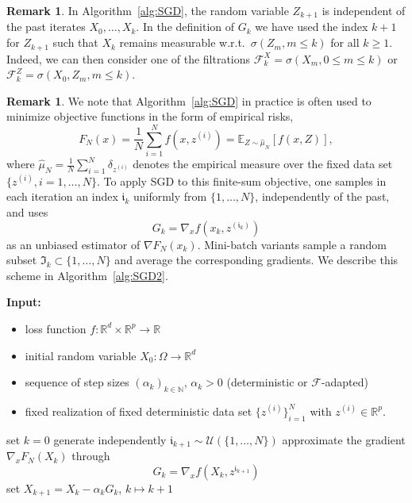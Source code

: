 \documentclass[12pt,openany]{book}
\theoremstyle{definition}
\newtheorem{remark}[thm]{Remark}
\theoremstyle{definition}
\newcommand{\E}{\mathbb{E}}
\newcommand{\N}{\mathbb{N}}
\newcommand{\R}{\mathbb{R}}
\begin{document}
\begin{remark}
In Algorithm~\ref{alg:SGD}, the random variable $Z_{k+1}$ is independent of the past iterates $X_0,\dots,X_k$. In the definition of $G_k$ we have used the index $k+1$ for $Z_{k+1}$ such that $X_k$ remains measurable w.r.t.~$\sigma(Z_m,m\le k)$ for all $k\ge1$. Indeed, we can then consider one of the filtrations $\mathcal F_k^X = \sigma(X_m,0\le m\le k)$ or $ \mathcal F_k^{Z}= \sigma(X_0,Z_m,m\le k)$.
\end{remark}

\begin{remark}
We note that Algorithm~\ref{alg:SGD} in practice is often used to minimize objective functions in the form of empirical risks,
\[F_N(x) = \frac1N\sum_{i=1}^N f(x,z^{(i)}) = \E_{Z\sim\widehat \mu_N}[f(x,Z)], \]
where $\widehat \mu_N=\frac1N\sum_{i=1}^N \delta_{z^{(i)}}$ denotes the empirical measure over the fixed data set $\{z^{(i)},i=1,\dots,N\}$. To apply SGD to this finite-sum objective, one samples in each iteration an index $\mathfrak i_k$ uniformly from $\{1,\dots,N\}$, independently of the past, and uses
\[
G_k=\nabla_x f(x_k,z^{(\mathfrak i_k)})
\]
as an unbiased estimator of $\nabla F_N(x_k)$. Mini-batch variants sample a random subset $\mathfrak I_k\subset\{1,\dots,N\}$ and average the corresponding gradients. We describe this scheme in Algorithm~\ref{alg:SGD2}.
\end{remark}

\begin{algorithm}[htb!]
\begin{algorithmic}[1]
\State \textbf{Input:} \begin{itemize}
 \item loss function $f:\R^d\times \R^p\to\R$
 \item initial random variable $X_0:\Omega\to\R^d$
 \item sequence of step sizes $(\alpha_k)_{k\in\N}$, $\alpha_k>0$ (deterministic or $\mathcal F$-adapted)
 \item fixed realization of fixed deterministic data set $\{z^{(i)}\}_{i=1}^N$ with $z^{(i)}\in\R^p$. 
 \end{itemize}
 \State set $k=0$
	\State generate independently $\mathfrak i_{k+1}\sim\mathcal U(\{1,\dots,N\})$
	\State approximate the gradient $\nabla_x F_N(X_k)$ through
	\[G_k = \nabla_x f(X_k,z^{\mathfrak i_{k+1}}) \]
	\State set $X_{k+1} = X_k -\alpha_k G_k$, $k \mapsto k+1$
\EndWhile
\end{algorithmic}
 \caption{Stochastic gradient descent method with finite data}\label{alg:SGD2}
\end{algorithm}
\end{document}
